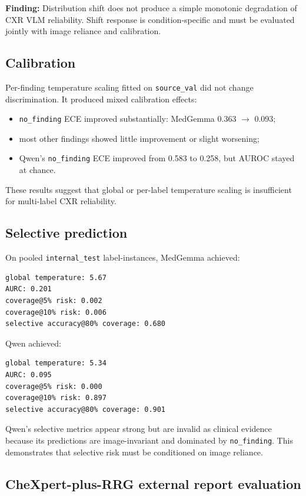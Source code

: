 \textbf{Finding:} Distribution shift does not produce a simple monotonic degradation of CXR VLM reliability. Shift response is condition-specific and must be evaluated jointly with image reliance and calibration.

\subsection{Calibration}

Per-finding temperature scaling fitted on \texttt{source\_val} did not change discrimination. It produced mixed calibration effects:

\begin{itemize}
\item \texttt{no\_finding} ECE improved substantially: MedGemma 0.363 $\rightarrow$ 0.093;
\item most other findings showed little improvement or slight worsening;
\item Qwen’s \texttt{no\_finding} ECE improved from 0.583 to 0.258, but AUROC stayed at chance.
\end{itemize}

These results suggest that global or per-label temperature scaling is insufficient for multi-label CXR reliability.

\subsection{Selective prediction}

On pooled \texttt{internal\_test} label-instances, MedGemma achieved:

\begin{verbatim}
global temperature: 5.67
AURC: 0.201
coverage@5% risk: 0.002
coverage@10% risk: 0.006
selective accuracy@80% coverage: 0.680
\end{verbatim}

Qwen achieved:

\begin{verbatim}
global temperature: 5.34
AURC: 0.095
coverage@5% risk: 0.000
coverage@10% risk: 0.897
selective accuracy@80% coverage: 0.901
\end{verbatim}

Qwen’s selective metrics appear strong but are invalid as clinical evidence because its predictions are image-invariant and dominated by \texttt{no\_finding}. This demonstrates that selective risk must be conditioned on image reliance.

\subsection{CheXpert-plus-RRG external report evaluation}

